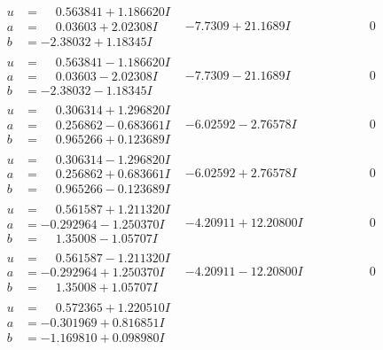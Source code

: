 \documentclass[1p]{elsarticle_modified}
\theoremstyle{definition}
\begin{document}
$$\begin{array}{c|c|c}
\begin{aligned}
u &= \phantom{-}0.563841 + 1.186620 I \\
a &= \phantom{-}0.03603 + 2.02308 I \\
b &= -2.38032 + 1.18345 I\end{aligned}
 & -7.7309 + 21.1689 I & \phantom{-0.000000 } 0 \\ \hline\begin{aligned}
u &= \phantom{-}0.563841 - 1.186620 I \\
a &= \phantom{-}0.03603 - 2.02308 I \\
b &= -2.38032 - 1.18345 I\end{aligned}
 & -7.7309 - 21.1689 I & \phantom{-0.000000 } 0 \\ \hline\begin{aligned}
u &= \phantom{-}0.306314 + 1.296820 I \\
a &= \phantom{-}0.256862 - 0.683661 I \\
b &= \phantom{-}0.965266 + 0.123689 I\end{aligned}
 & -6.02592 - 2.76578 I & \phantom{-0.000000 } 0 \\ \hline\begin{aligned}
u &= \phantom{-}0.306314 - 1.296820 I \\
a &= \phantom{-}0.256862 + 0.683661 I \\
b &= \phantom{-}0.965266 - 0.123689 I\end{aligned}
 & -6.02592 + 2.76578 I & \phantom{-0.000000 } 0 \\ \hline\begin{aligned}
u &= \phantom{-}0.561587 + 1.211320 I \\
a &= -0.292964 - 1.250370 I \\
b &= \phantom{-}1.35008 - 1.05707 I\end{aligned}
 & -4.20911 + 12.20800 I & \phantom{-0.000000 } 0 \\ \hline\begin{aligned}
u &= \phantom{-}0.561587 - 1.211320 I \\
a &= -0.292964 + 1.250370 I \\
b &= \phantom{-}1.35008 + 1.05707 I\end{aligned}
 & -4.20911 - 12.20800 I & \phantom{-0.000000 } 0 \\ \hline\begin{aligned}
u &= \phantom{-}0.572365 + 1.220510 I \\
a &= -0.301969 + 0.816851 I \\
b &= -1.169810 + 0.098980 I\end{aligned}

\end{array}$$
\end{document}
